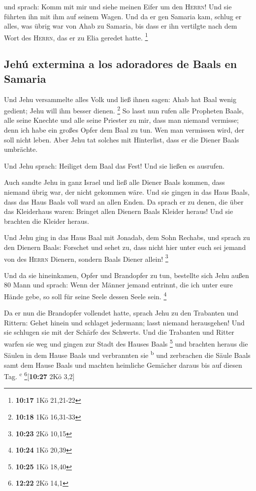  und sprach: Komm mit mir und siehe meinen Eifer um den
\textsc{Herrn}! Und sie führten ihn mit ihm auf seinem Wagen.
 Und da er gen Samaria kam, schlug er alles, was übrig
war von Ahab zu Samaria, bis dass er ihn vertilgte nach dem Wort des
\textsc{Herrn}, das er zu Elia geredet hatte. \footnote{\textbf{10:17}
  1Kö 21,21-22}

\hypertarget{jehuxfa-extermina-a-los-adoradores-de-baals-en-samaria}{%
\subsection{Jehú extermina a los adoradores de Baals en
Samaria}\label{jehuxfa-extermina-a-los-adoradores-de-baals-en-samaria}}

 Und Jehu versammelte alles Volk und ließ ihnen sagen:
Ahab hat Baal wenig gedient; Jehu will ihm besser dienen. \footnote{\textbf{10:18}
  1Kö 16,31-33}  So lasst nun rufen alle Propheten Baals,
alle seine Knechte und alle seine Priester zu mir, dass man niemand
vermisse; denn ich habe ein großes Opfer dem Baal zu tun. Wen man
vermissen wird, der soll nicht leben. Aber Jehu tat solches mit
Hinterlist, dass er die Diener Baals umbrächte.

 Und Jehu sprach: Heiliget dem Baal das Fest! Und sie
ließen es ausrufen.

 Auch sandte Jehu in ganz Israel und ließ alle Diener
Baals kommen, dass niemand übrig war, der nicht gekommen wäre. Und sie
gingen in das Haus Baals, dass das Haus Baals voll ward an allen Enden.
 Da sprach er zu denen, die über das Kleiderhaus waren:
Bringet allen Dienern Baals Kleider heraus! Und sie brachten die Kleider
heraus.

 Und Jehu ging in das Haus Baal mit Jonadab, dem Sohn
Rechabs, und sprach zu den Dienern Baals: Forschet und sehet zu, dass
nicht hier unter euch sei jemand von des \textsc{Herrn} Dienern, sondern
Baals Diener allein! \footnote{\textbf{10:23} 2Kö 10,15}

 Und da sie hineinkamen, Opfer und Brandopfer zu tun,
bestellte sich Jehu außen 80 Mann und sprach: Wenn der Männer jemand
entrinnt, die ich unter eure Hände gebe, so soll für seine Seele dessen
Seele sein. \footnote{\textbf{10:24} 1Kö 20,39}

 Da er nun die Brandopfer vollendet hatte, sprach Jehu zu
den Trabanten und Rittern: Gehet hinein und schlaget jedermann; lasst
niemand herausgehen! Und sie schlugen sie mit der Schärfe des Schwerts.
Und die Trabanten und Ritter warfen sie weg und gingen zur Stadt des
Hauses Baals \footnote{\textbf{10:25} 1Kö 18,40}  und
brachten heraus die Säulen in dem Hause Baals und verbrannten sie
\textsuperscript{b}  und zerbrachen die Säule Baals samt
dem Hause Baals und machten heimliche Gemächer daraus bis auf diesen
Tag. \textsuperscript{c} \footnote{\textbf{12:22} 2Kö 14,1}{[}\textbf{10:27}
2Kö 3,2{]}

